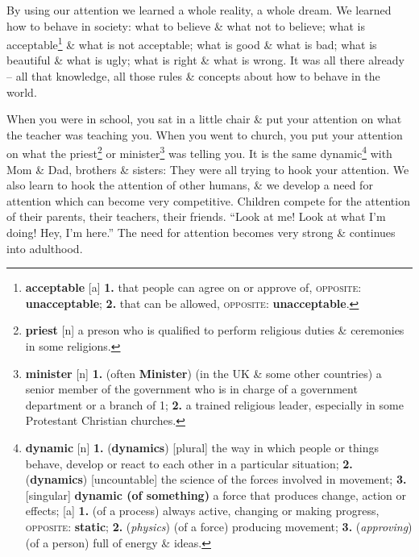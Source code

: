 \documentclass[oneside]{book}
\numberwithin{equation}{section}
\begin{document}
By using our attention we learned a whole reality, a whole dream. We learned how to behave in society: what to believe \& what not to believe; what is acceptable\footnote{\textbf{acceptable} [a] \textbf{1.} that people can agree on or approve of, \textsc{opposite}: \textbf{unacceptable}; \textbf{2.} that can be allowed, \textsc{opposite}: \textbf{unacceptable}.} \& what is not acceptable; what is good \& what is bad; what is beautiful \& what is ugly; what is right \& what is wrong. It was all there already -- all that knowledge, all those rules \& concepts about how to behave in the world.

When you were in school, you sat in a little chair \& put your attention on what the teacher was teaching you. When you went to church, you put your attention on what the priest\footnote{\textbf{priest} [n] a preson who is qualified to perform religious duties \& ceremonies in some religions.} or minister\footnote{\textbf{minister} [n] \textbf{1.} (often \textbf{Minister}) (in the UK \& some other countries) a senior member of the government who is in charge of a government department or a branch of 1; \textbf{2.} a trained religious leader, especially in some Protestant Christian churches.} was telling you. It is the same dynamic\footnote{\textbf{dynamic} [n] \textbf{1.} (\textbf{dynamics}) [plural] the way in which people or things behave, develop or react to each other in a particular situation; \textbf{2.} (\textbf{dynamics}) [uncountable] the science of the forces involved in movement; \textbf{3.} [singular] \textbf{dynamic (of something)} a force that produces change, action or effects; [a] \textbf{1.} (of a process) always active, changing or making progress, \textsc{opposite}: \textbf{static}; \textbf{2.} (\textit{physics}) (of a force) producing movement; \textbf{3.} (\textit{approving}) (of a person) full of energy \& ideas.} with Mom \& Dad, brothers \& sisters: They were all trying to hook your attention. We also learn to hook the attention of other humans, \& we develop a need for attention which can become very competitive. Children compete for the attention of their parents, their teachers, their friends. ``Look at me! Look at what I'm doing! Hey, I'm here.'' The need for attention becomes very strong \& continues into adulthood.
\end{document}
